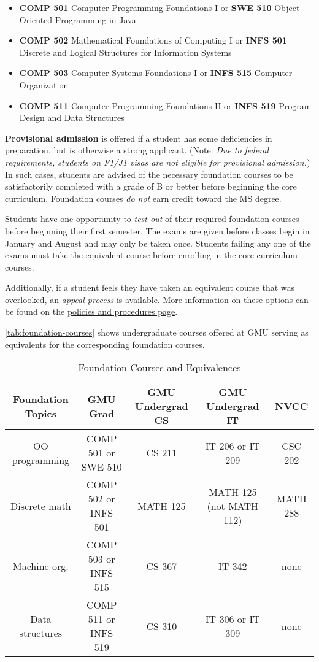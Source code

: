 \documentclass[oneside,11pt]{memoir}
\begin{document}
\begin{itemize}
\item \textbf{COMP 501} Computer Programming Foundations I or \textbf{SWE 510} Object Oriented Programming in Java
\item \textbf{COMP 502} Mathematical Foundations of Computing I or \textbf{INFS 501} Discrete and Logical Structures for Information Systems
\item \textbf{COMP 503} Computer Systems Foundations I or \textbf{INFS 515} Computer Organization
\item \textbf{COMP 511} Computer Programming Foundations II or \textbf{INFS 519} Program Design and Data Structures
\end{itemize}

\textbf{Provisional admission} is offered if a student has some deficiencies in preparation, but is otherwise a strong applicant. (Note: \emph{Due to federal requirements, students on F1/J1 visas are not eligible for provisional admission.}) In such cases, students are advised of the necessary foundation courses to be satisfactorily completed with a grade of B or better before beginning the core curriculum. Foundation courses \emph{do not} earn credit toward the MS degree. 

Students have one opportunity to \emph{test out} of their required foundation courses before beginning their first semester. 
The exams are given before classes begin in January and August and may only be taken once. Students failing any one of the exams must take the equivalent course before enrolling in the core curriculum courses.

Additionally, if a student feels they have taken an equivalent course that was overlooked, an \emph{appeal process} is available. More information on these options can be found on the \href{https://cs.gmu.edu/current-students/ms-students/foundation-courses/policies-and-procedures/}{policies and procedures page}.

\autoref{tab:foundation-courses} shows undergraduate courses offered at GMU serving as equivalents for the corresponding foundation courses.

\begin{table}[]
    \centering
    \footnotesize
    \begin{tabular}{c|c|c|c|c}
      Foundation Topics   & GMU Grad  &	GMU Undergrad CS &	GMU Undergrad IT &	NVCC\\
      \midrule
      OO programming & 	COMP 501 or SWE 510 & 	CS 211 & 	IT 206 or IT 209 &	CSC 202\\
      Discrete math              &	COMP 502 or INFS 501 & 	MATH 125 & 	MATH 125 (not MATH 112) & 	MATH 288\\
      Machine org. 	& COMP 503 or INFS 515 &	CS 367 	&IT 342 	& none\\
      Data structures &	COMP 511 or INFS 519 &	CS 310 	& IT 306 or IT 309 &	none\\
    \end{tabular}
    \caption{Foundation Courses and Equivalences}
    \label{tab:foundation-courses}
\end{table}
\end{document}
